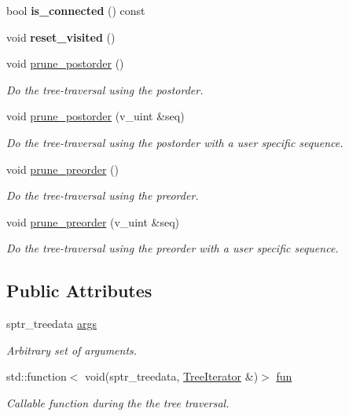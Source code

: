 \begin{DoxyCompactItemize}
\item 
bool {\bfseries is\+\_\+connected} () const \hypertarget{classTree_a9f911acd648bbae87eaa018e61289903}{}\label{classTree_a9f911acd648bbae87eaa018e61289903}

\item 
void {\bfseries reset\+\_\+visited} ()\hypertarget{classTree_adb83bb19c14623ce57ac6d1b84b1c2ff}{}\label{classTree_adb83bb19c14623ce57ac6d1b84b1c2ff}

\item 
void \hyperlink{classTree_a7d465880d18acf79f3a772ea5412b0d7}{prune\+\_\+postorder} ()
\begin{DoxyCompactList}\small\item\em Do the tree-\/traversal using the postorder. \end{DoxyCompactList}\item 
void \hyperlink{classTree_a8318027f3d2b1a07bf25e813c7c80056}{prune\+\_\+postorder} (v\+\_\+uint \&seq)
\begin{DoxyCompactList}\small\item\em Do the tree-\/traversal using the postorder with a user specific sequence. \end{DoxyCompactList}\item 
void \hyperlink{classTree_ac85bfb083b3856e65987e1d15885a61c}{prune\+\_\+preorder} ()
\begin{DoxyCompactList}\small\item\em Do the tree-\/traversal using the preorder. \end{DoxyCompactList}\item 
void \hyperlink{classTree_a6841109c7ff37bcabdf3a4d79009ad21}{prune\+\_\+preorder} (v\+\_\+uint \&seq)
\begin{DoxyCompactList}\small\item\em Do the tree-\/traversal using the preorder with a user specific sequence. \end{DoxyCompactList}\end{DoxyCompactItemize}
\subsection*{Public Attributes}
\begin{DoxyCompactItemize}
\item 
sptr\+\_\+treedata \hyperlink{classTree_ac2ff3911dfe768b18be9f6cc2baca89e}{args}\hypertarget{classTree_ac2ff3911dfe768b18be9f6cc2baca89e}{}\label{classTree_ac2ff3911dfe768b18be9f6cc2baca89e}

\begin{DoxyCompactList}\small\item\em Arbitrary set of arguments. \end{DoxyCompactList}\item 
std\+::function$<$ void(sptr\+\_\+treedata, \hyperlink{classTreeIterator}{Tree\+Iterator} \&)$>$ \hyperlink{classTree_ad98f51efc931f96c687c65d4387d19e9}{fun}
\begin{DoxyCompactList}\small\item\em Callable function during the the tree traversal. \end{DoxyCompactList}\end{DoxyCompactItemize}
